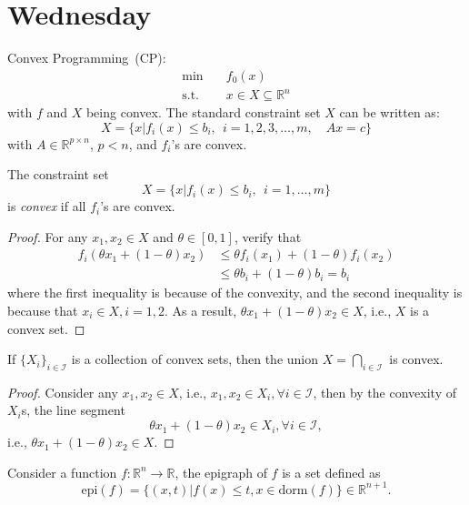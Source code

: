 
\section{Wednesday}

Convex Programming~(CP):
\[
\begin{array}{ll}
\min&\quad f_0(x)\\
\mbox{s.t.}&\quad x\in X\subseteq\mathbb{R}^n
\end{array}
\]
with $f$ and $X$ being convex.
The standard constraint set $X$ can be written as:
\begin{equation*}
X=\bigg\{
x\bigg|
f_i(x)\le b_i,~~
i=1,2,3,\ldots,m,\quad
Ax=c
\bigg\}
\end{equation*}
with $A\in\mathbb{R}^{p\times n}$, $p<n$, and $f_i$'s are convex.

\begin{proposition}
The constraint set
\[
X=\bigg\{
x\bigg|
f_i(x)\le b_i,~~i=1,\dots,m
\bigg\}
\]
is \emph{convex} if all $f_i$'s are convex.
\end{proposition}
\begin{proof}
For any $x_1,x_2\in X$ and $\theta\in[0,1]$, verify that
\begin{align*}
f_i(\theta x_1 + (1-\theta)x_2)
&\le 
\theta f_i(x_1) + (1-\theta) f_i(x_2)\\
&\le \theta b_i + (1-\theta)b_i=b_i
\end{align*}
where the first inequality is because of the convexity,
and the second inequality is because that $x_i\in X, i=1,2$.
As a result, $\theta x_1 + (1-\theta)x_2\in X$, i.e., $X$ is a convex set.
\end{proof}

\begin{proposition}
If $\{X_i\}_{i\in\mathcal{I}}$ is a collection of convex sets, then the union $X=\bigcap_{i\in \mathcal{I}}$ is convex.
\end{proposition}
\begin{proof}
Consider any $x_1,x_2\in X$, i.e., $x_1,x_2\in X_i,\forall i\in\mathcal{I}$, then by the convexity of $X_i$s, the line segment
\[
\theta x_1 + (1-\theta)x_2\in X_i,\forall i\in\mathcal{I},
\]
i.e., $\theta x_1 + (1-\theta)x_2\in X$.
\end{proof}

\begin{definition}[Epigraph]
Consider a function $f:\mathbb{R}^n\to\mathbb{R}$, 
the epigraph of $f$ is a set defined as
\[
\text{epi}(f)
=
\bigg\{
(x,t)\bigg|
f(x)\le t ,x\in\text{dorm}(f)
\bigg\}\in\mathbb{R}^{n+1}.
\]
\end{definition}

